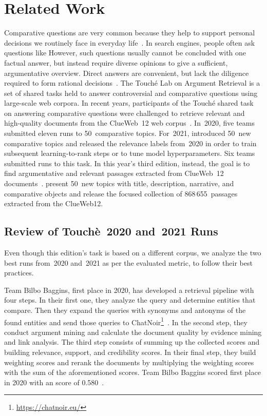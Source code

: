 \section{Related Work}

Comparative questions are very common because they help to support personal decisions we routinely face in everyday life~\cite{BondarenkoFBGAPBSWPH2020,BondarenkoGFBAPBSWPH2021,BondarenkoFKSGBPBSWPH2022}.
In search engines, people often ask questions like 
However, such questions usually cannot be concluded with one factual answer, but instead require diverse opinions to give a sufficient, argumentative overview.
Direct answers are convenient, but lack the diligence required to form rational decisions~\cite{BondarenkoFBGAPBSWPH2020,PotthastHS2020}.
The Touché Lab on Argument Retrieval is a set of shared tasks held to answer controversial and comparative questions using large-scale web corpora.
In recent years, participants of the Touché shared task on answering comparative questions were challenged to retrieve relevant and high-quality documents from the ClueWeb~12 web corpus~\cite{BondarenkoFBGAPBSWPH2020,BondarenkoGFBAPBSWPH2021,BondarenkoFKSGBPBSWPH2022}.
In~2020, five teams submitted eleven runs to 50~comparative topics.
For~2021, \citeauthor{BondarenkoGFBAPBSWPH2021} introduced 50~new comparative topics and released the relevance labels from~2020 in order to train subsequent learning-to-rank steps or to tune model hyperparameters.
Six teams submitted runs to this task.
In this year's third edition, instead, the goal is to find argumentative and relevant passages extracted from ClueWeb~12 documents~\cite{BondarenkoFKSGBPBSWPH2022}.
\citeauthor{BondarenkoFKSGBPBSWPH2022} present 50~new topics with title, description, narrative, and comparative objects and release the focused collection of 868\,655~passages extracted from the ClueWeb12.

\subsection{Review of Touchè~2020 and~2021 Runs}

Even though this edition's task is based on a different corpus, we analyze the two best runs from~2020 and~2021 as per the evaluated  metric, to follow their best practices.

Team Bilbo Baggins, first place in 2020, has developed a retrieval pipeline with four steps.
In their first one, they analyze the query and determine entities that compare.
Then they expand the queries with synonyms and antonyms of the found entities and send those queries to ChatNoir\footnote{\url{https://chatnoir.eu/}}~\cite{BevendorffSHP2018}.
In the second step, they conduct argument mining and calculate the document quality by evidence mining and link analysis.
The third step consists of summing up the collected scores and building relevance, support, and credibility scores.
In their final step, they build weighting scores and rerank the documents by multiplying the weighting scores with the sum of the aforementioned scores.
Team Bilbo Baggins scored first place in 2020 with an  score of 0.580~\cite{AbyeST2020}.


